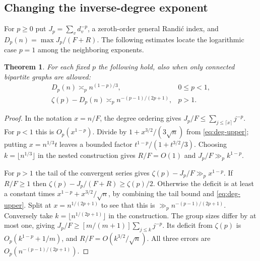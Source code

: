 \documentclass[11pt,a4paper]{article}
\newtheorem{theorem}{Theorem}[section]
\theoremstyle{remark}\newtheorem*{remark}{Remark}
\begin{document}
\subsection{Changing the inverse-degree exponent}
For $p\ge0$ put $J_p=\sum_vd_v^{-p}$, a zeroth-order general Randi\'c
index, and $D_p(n)=\max J_p/(F+R)$. The following estimates locate the
logarithmic case $p=1$ among the neighboring exponents.
\begin{theorem}\label{thm:degree-powers}
For each fixed $p$ the following hold, also when only connected bipartite
graphs are allowed:
\[
 \begin{array}{ll}
 D_p(n)\asymp_p n^{(1-p)/3}, &0\le p<1,\\[2pt]
 \zeta(p)-D_p(n)\asymp_p n^{-(p-1)/(2p+1)},&p>1.
 \end{array}
\]
\end{theorem}
\begin{proof}
In the notation $x=n/F$, the degree ordering gives
$J_p/F\le\sum_{j\le\lceil x\rceil} j^{-p}$. For $p<1$ this is
$O_p(x^{1-p})$. Divide by $1+x^{3/2}/(3\sqrt n)$ from
\eqref{eq:deg-upper}; putting $x=n^{1/3}t$ leaves a bounded factor
$t^{1-p}/(1+t^{3/2}/3)$. Choosing $k=\lfloor n^{1/3}\rfloor$ in the
nested construction gives $R/F=O(1)$ and $J_p/F\gg_p k^{1-p}$.

For $p>1$ the tail of the convergent series gives
$\zeta(p)-J_p/F\gg_p x^{1-p}$. If $R/F\ge1$ then
$\zeta(p)-J_p/(F+R)\ge\zeta(p)/2$. Otherwise the deficit is at least
a constant times $x^{1-p}+x^{3/2}/\sqrt n$, by combining the tail
bound and \eqref{eq:deg-upper}. Split at $x=n^{1/(2p+1)}$ to see that
this is $\gg_p n^{-(p-1)/(2p+1)}$. Conversely take
$k=\lfloor n^{1/(2p+1)}\rfloor$ in the construction. The group sizes
differ by at most one, giving
$J_p/F\ge [m/(m+1)]\sum_{j\le k}j^{-p}$. Its deficit from $\zeta(p)$
is $O_p(k^{1-p}+1/m)$, and $R/F=O(k^{3/2}/\sqrt n)$.
All three errors are $O_p(n^{-(p-1)/(2p+1)})$.
\end{proof}
\end{document}
